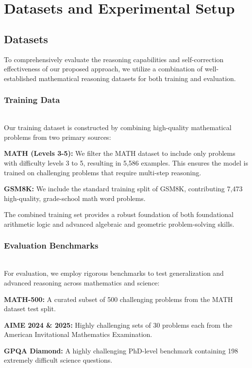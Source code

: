 \section{Datasets and Experimental Setup}

\subsection{Datasets}
To comprehensively evaluate the reasoning capabilities and self-correction effectiveness of our proposed approach, we utilize a combination of well-established mathematical reasoning datasets for both training and evaluation.

\subsubsection{Training Data} \mbox{} \\
Our training dataset is constructed by combining high-quality mathematical problems from two primary sources:

\textbf{MATH (Levels 3-5):} We filter the MATH dataset to include only problems with difficulty levels 3 to 5, resulting in 5,586 examples. This ensures the model is trained on challenging problems that require multi-step reasoning.

\textbf{GSM8K:} We include the standard training split of GSM8K, contributing 7,473 high-quality, grade-school math word problems.

The combined training set provides a robust foundation of both foundational arithmetic logic and advanced algebraic and geometric problem-solving skills.

\subsubsection{Evaluation Benchmarks} \mbox{} \\
For evaluation, we employ rigorous benchmarks to test generalization and advanced reasoning across mathematics and science:

\textbf{MATH-500:} A curated subset of 500 challenging problems from the MATH dataset test split.

\textbf{AIME 2024 \& 2025:} Highly challenging sets of 30 problems each from the American Invitational Mathematics Examination.

\textbf{GPQA Diamond:} A highly challenging PhD-level benchmark containing 198 extremely difficult science questions.

